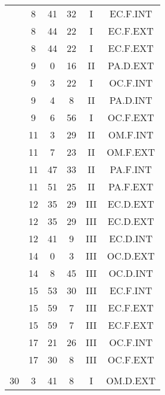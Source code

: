 \documentclass[12pt, a4paper]{article}
\begin{document}
\begin{multicols}{3}
{\begin{tabular}{c c c c c c}
	 	 	 	 & 8 & 41 & 32 & I & EC.F.INT\\%
	 	 	 	 & 8 & 44 & 22 & I & EC.F.EXT\\%
	 	 	 	 & 8 & 44 & 22 & I & EC.F.EXT\\%
	 	 	 	 & 9 & 0 & 16 & II & PA.D.EXT\\%
	 	 	 	 & 9 & 3 & 22 & I & OC.F.INT\\%
	 	 	 	 & 9 & 4 & 8 & II & PA.D.INT\\%
	 	 	 	 & 9 & 6 & 56 & I & OC.F.EXT\\%
	 	 	 	 & 11 & 3 & 29 & II & OM.F.INT\\%
	 	 	 	 & 11 & 7 & 23 & II & OM.F.EXT\\%
	 	 	 	 & 11 & 47 & 33 & II & PA.F.INT\\%
	 	 	 	 & 11 & 51 & 25 & II & PA.F.EXT\\%
	 	 	 	 & 12 & 35 & 29 & III & EC.D.EXT\\%
	 	 	 	 & 12 & 35 & 29 & III & EC.D.EXT\\%
	 	 	 	 & 12 & 41 & 9 & III & EC.D.INT\\%
	 	 	 	 & 14 & 0 & 3 & III & OC.D.EXT\\%
	 	 	 	 & 14 & 8 & 45 & III & OC.D.INT\\%
	 	 	 	 & 15 & 53 & 30 & III & EC.F.INT\\%
	 	 	 	 & 15 & 59 & 7 & III & EC.F.EXT\\%
	 	 	 	 & 15 & 59 & 7 & III & EC.F.EXT\\%
	 	 	 	 & 17 & 21 & 26 & III & OC.F.INT\\%
	 	 	 	 & 17 & 30 & 8 & III & OC.F.EXT\\%
	 	 	 	 & & & & & \\%
	 	 	 	30 & 3 & 41 & 8 & I & OM.D.EXT\\%

\end{tabular}}
\end{multicols}
\end{document}
